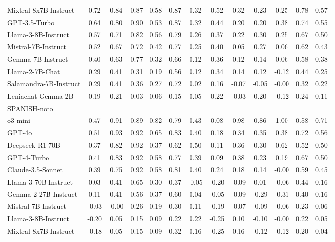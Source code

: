 \begin{table*}[ht]
{\begin{tabular}{lcccccccccccc}
Mixtral-8x7B-Instruct & 0.72 & 0.84 & 0.87 & 0.58 & 0.87 & 0.32 & 0.52 & 0.32 & 0.23 & 0.25 & 0.78 & 0.57 \\
GPT-3.5-Turbo & 0.64 & 0.80 & 0.90 & 0.53 & 0.87 & 0.32 & 0.44 & 0.20 & 0.20 & 0.38 & 0.74 & 0.55 \\
Llama-3-8B-Instruct & 0.57 & 0.71 & 0.82 & 0.56 & 0.79 & 0.26 & 0.37 & 0.22 & 0.30 & 0.25 & 0.67 & 0.50 \\
Mistral-7B-Instruct & 0.52 & 0.67 & 0.72 & 0.42 & 0.77 & 0.25 & 0.40 & 0.05 & 0.27 & 0.06 & 0.62 & 0.43 \\
Gemma-7B-Instruct & 0.40 & 0.63 & 0.77 & 0.32 & 0.66 & 0.12 & 0.36 & 0.12 & 0.14 & 0.06 & 0.58 & 0.38 \\
Llama-2-7B-Chat & 0.29 & 0.41 & 0.31 & 0.19 & 0.56 & 0.12 & 0.34 & 0.14 & 0.12 & -0.12 & 0.44 & 0.25 \\
Salamandra-7B-Instruct & 0.29 & 0.41 & 0.36 & 0.27 & 0.72 & 0.02 & 0.16 & -0.07 & -0.05 & -0.00 & 0.32 & 0.22 \\
Leniachat-Gemma-2B & 0.19 & 0.21 & 0.03 & 0.06 & 0.15 & 0.05 & 0.22 & -0.03 & 0.20 & -0.12 & 0.24 & 0.11 \\
\midrule
SPANISH-noto &&&&&&&&&&&&\\
\midrule
o3-mini & 0.47 & 0.91 & 0.89 & 0.82 & 0.79 & 0.43 & 0.08 & 0.98 & 0.86 & 1.00 & 0.58 & 0.71 \\
GPT-4o & 0.51 & 0.93 & 0.92 & 0.65 & 0.83 & 0.40 & 0.18 & 0.34 & 0.35 & 0.38 & 0.72 & 0.56 \\
Deepseek-R1-70B & 0.37 & 0.82 & 0.92 & 0.37 & 0.62 & 0.50 & 0.11 & 0.36 & 0.30 & 0.62 & 0.52 & 0.50 \\
GPT-4-Turbo & 0.41 & 0.83 & 0.92 & 0.58 & 0.77 & 0.39 & 0.09 & 0.38 & 0.23 & 0.19 & 0.67 & 0.50 \\
Claude-3.5-Sonnet & 0.39 & 0.75 & 0.92 & 0.58 & 0.81 & 0.40 & 0.24 & 0.18 & 0.14 & -0.00 & 0.59 & 0.45 \\
Llama-3-70B-Instruct & 0.03 & 0.41 & 0.65 & 0.30 & 0.37 & -0.05 & -0.20 & -0.09 & 0.01 & -0.06 & 0.44 & 0.16 \\
Gemma-2-27B-Instruct & 0.11 & 0.41 & 0.56 & 0.37 & 0.60 & 0.04 & -0.05 & -0.09 & -0.29 & -0.31 & 0.40 & 0.16 \\
Mistral-7B-Instruct & -0.03 & -0.00 & 0.26 & 0.19 & 0.30 & 0.11 & -0.19 & -0.07 & -0.09 & -0.06 & 0.23 & 0.06 \\
Llama-3-8B-Instruct & -0.20 & 0.05 & 0.15 & 0.09 & 0.22 & 0.22 & -0.25 & 0.10 & -0.10 & -0.00 & 0.22 & 0.05 \\
Mixtral-8x7B-Instruct & -0.18 & 0.05 & 0.15 & 0.09 & 0.32 & 0.16 & -0.25 & 0.16 & -0.12 & -0.12 & 0.20 & 0.04 \\

\end{tabular}}
\end{table*}
